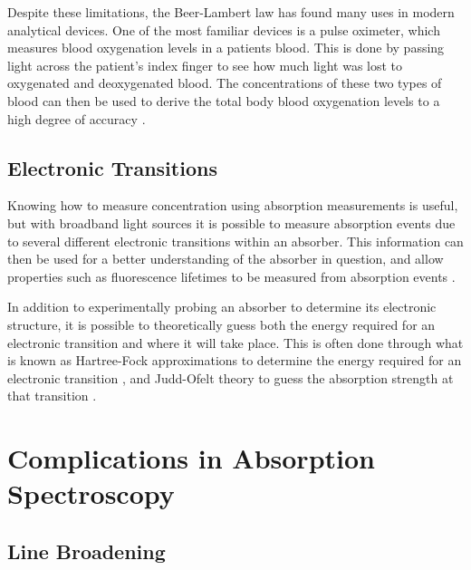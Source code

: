 Despite these limitations, the Beer-Lambert law has found many uses in modern
analytical devices. One of the most familiar devices is a pulse oximeter, which
measures blood oxygenation levels in a patients blood. This is done by passing
light across the patient's index finger to see how much light was lost to
oxygenated and deoxygenated blood. The concentrations of these two types of
blood can then be used to derive the total body blood oxygenation levels to a
high degree of accuracy \cite{Wukitsch:1987tb}.



\subsection{Electronic Transitions}\label{subsec:elec_trans}


Knowing how to measure concentration using absorption measurements is useful,
but with broadband light sources it is possible to measure absorption events
due to several different electronic transitions within an absorber. This
information can then be used for a better understanding of the absorber in
question, and allow properties such as fluorescence lifetimes to be measured
from absorption events \cite{Werts:2002fs}.

In addition to experimentally probing an absorber to determine its electronic
structure, it is possible to theoretically guess both the energy required for
an electronic transition and where it will take place. This is often done
through what is known as Hartree-Fock approximations to determine the energy
required for an electronic transition \cite{Szabo:1996tu}, and Judd-Ofelt
theory to guess the absorption strength at that transition \cite{Judd:1962uq}.



\section{Complications in Absorption Spectroscopy}\label{sec:comp_abs}



\subsection{Line Broadening}\label{subsec:line_broad}

